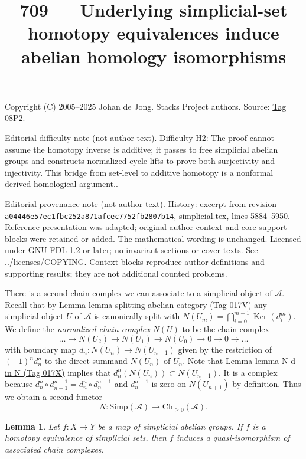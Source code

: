 \documentclass{amsart}
\theoremstyle{plain}
\newtheorem{lemma}[subsection]{Lemma}
\theoremstyle{definition}
\theoremstyle{remark}
\numberwithin{equation}{subsection}
\def\Ker{\mathop{\mathrm{Ker}}}
\begin{document}
\title[Stacks Project, Tag 08P2]{709 --- Underlying simplicial-set homotopy equivalences induce abelian homology isomorphisms}
\maketitle
\noindent Copyright (C) 2005--2025 Johan de Jong. Stacks Project authors. Source: \href{https://stacks.math.columbia.edu/tag/08P2}{Tag 08P2}.

\noindent Editorial difficulty note (not author text). Difficulty H2: The proof cannot assume the homotopy inverse is additive; it passes to free simplicial abelian groups and constructs normalized cycle lifts to prove both surjectivity and injectivity. This bridge from set-level to additive homotopy is a nonformal derived-homological argument..

\noindent Editorial provenance note (not author text). History: excerpt from revision \texttt{a0444\allowbreak 6e57e\allowbreak c1fbc\allowbreak 252a8\allowbreak 71afc\allowbreak ec775\allowbreak 2fb28\allowbreak 07b14}, simplicial.tex, lines 5884--5950. Reference presentation was adapted; original-author context and core support blocks were retained or added. The mathematical wording is unchanged. Licensed under GNU FDL 1.2 or later; no invariant sections or cover texts. See ../licenses/COPYING. Context blocks reproduce author definitions and supporting results; they are not additional counted problems.

\noindent
There is a second chain complex we can associate to
a simplicial object of $\mathcal{A}$. Recall that by
Lemma \href{https://stacks.math.columbia.edu/tag/017V}{lemma splitting abelian category (Tag 017V)}
any simplicial object $U$ of $\mathcal{A}$
is canonically split with
$N(U_m) = \bigcap_{i = 0}^{m - 1} \Ker(d^m_i)$.
We define the {\it normalized chain complex $N(U)$}
to be the chain complex
$$
\ldots \to N(U_2) \to N(U_1) \to N(U_0) \to 0 \to 0 \to \ldots
$$
with boundary map $d_n : N(U_n) \to N(U_{n - 1})$ given
by the restriction of $(-1)^nd^n_n$ to the direct summand
$N(U_n)$ of $U_n$. Note that Lemma \href{https://stacks.math.columbia.edu/tag/017X}{lemma N d in N (Tag 017X)}
implies that $d^n_n(N(U_n)) \subset N(U_{n - 1})$.
It is a complex because
$d^n_n \circ d^{n + 1}_{n + 1} = d^n_n \circ d^{n + 1}_n$
and $d^{n + 1}_n$ is zero on $N(U_{n + 1})$ by definition.
Thus we obtain a second functor
$$
N : \text{Simp}(\mathcal{A}) \longrightarrow \text{Ch}_{\geq 0}(\mathcal{A}).
$$


\begin{lemma}
\label{lemma-homotopy-equivalence}
Let $f : X \to Y$ be a map of simplicial abelian groups. If $f$ is a
homotopy equivalence of simplicial sets, then $f$ induces a
quasi-isomorphism of associated chain complexes.
\end{lemma}
\end{document}
